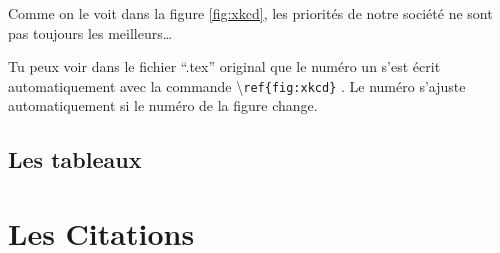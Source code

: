 \documentclass[a4paper, 10pt]{article}
\newcommand{\command}[1]{
  \colorbox{codebackground}{\scriptsize{\textbackslash}\texttt{#1}}
}
\begin{document}
\begin{center}
Comme on le voit dans la figure \ref{fig:xkcd}, les priorités de notre société
ne sont pas toujours les meilleurs\ldots
\end{center}

Tu peux voir dans le fichier ``.tex'' original que le numéro un s'est écrit
automatiquement avec la commande \command{ref\{fig:xkcd\}}. Le numéro s'ajuste
automatiquement si le numéro de la figure change.

\subsection{Les tableaux}

\section{Les Citations}
\end{document}
